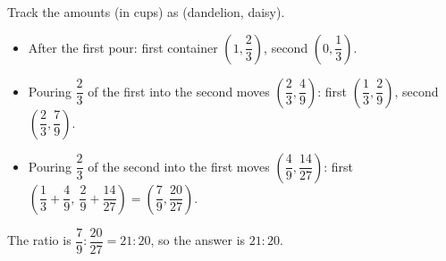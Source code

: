 Track the amounts (in cups) as (dandelion, daisy).
\begin{itemize}
\item After the first pour: first container $\left(1,\dfrac23\right)$, second $\left(0,\dfrac13\right)$.
\item Pouring $\dfrac23$ of the first into the second moves $\left(\dfrac23,\dfrac49\right)$: first $\left(\dfrac13,\dfrac29\right)$, second $\left(\dfrac23,\dfrac79\right)$.
\item Pouring $\dfrac23$ of the second into the first moves $\left(\dfrac49,\dfrac{14}{27}\right)$: first $\left(\dfrac13+\dfrac49,\ \dfrac29+\dfrac{14}{27}\right)=\left(\dfrac79,\dfrac{20}{27}\right)$.
\end{itemize}
The ratio is $\dfrac79:\dfrac{20}{27}=21:20$, so the answer is $\boxed{21:20}$.
